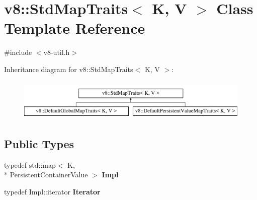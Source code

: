 \hypertarget{classv8_1_1StdMapTraits}{\section{v8\-:\-:Std\-Map\-Traits$<$ K, V $>$ Class Template Reference}
\label{classv8_1_1StdMapTraits}
}


{\ttfamily \#include $<$v8-\/util.\-h$>$}

Inheritance diagram for v8\-:\-:Std\-Map\-Traits$<$ K, V $>$\-:\begin{figure}[H]
\begin{center}
\leavevmode
\includegraphics[height=2.000000cm]{classv8_1_1StdMapTraits}
\end{center}
\end{figure}
\subsection*{Public Types}
\begin{DoxyCompactItemize}
\item 
\hypertarget{classv8_1_1StdMapTraits_ac64cb78b3ef5cfbc35cf03837552e4ea}{typedef std\-::map$<$ K, \\*
Persistent\-Container\-Value $>$ {\bfseries Impl}}\label{classv8_1_1StdMapTraits_ac64cb78b3ef5cfbc35cf03837552e4ea}

\item 
\hypertarget{classv8_1_1StdMapTraits_ad20ef2022e83bfba6dcee23a2a34098e}{typedef Impl\-::iterator {\bfseries Iterator}}\label{classv8_1_1StdMapTraits_ad20ef2022e83bfba6dcee23a2a34098e}

\end{DoxyCompactItemize}

